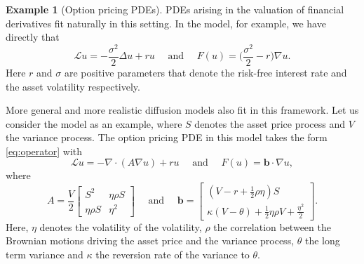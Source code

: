 \documentclass[11pt,a4paper,reqno]{amsart}
\numberwithin{equation}{section}
\theoremstyle{plain}
\theoremstyle{definition}
\newtheorem{example}[theorem]{Example}
\begin{document}
\begin{example}[Option pricing PDEs]
\label{ex:option}
PDEs arising in the valuation of financial derivatives fit naturally in this setting. 
In the \citet{scholes1973pricing} model, for example, we have directly that
\[
    \mathcal{L} u = - \frac{\sigma^2}{2} \Delta u + r u \quad \text{ and } \quad F(u) = \Big( \frac{\sigma^2}{2} - r \Big) \nabla u.
\]
Here $r$ and $\sigma$ are positive parameters that denote the risk-free interest rate and the asset volatility respectively.

More general and more realistic diffusion models also fit in this framework.
Let us consider the \citet{heston1993closed} model as an example, where $S$ denotes the asset price process and $V$ the variance process. 
The option pricing PDE in this model takes the form \eqref{eq:operator} with 
\begin{equation}\label{eq:PR}
\mathcal{L} u = - \nabla \cdot (A \nabla u ) + ru \quad \text{ and } \quad F(u) = \mathbf{b} \cdot \nabla u,
\end{equation}
where
\[
A = \frac{V}{2} \begin{bmatrix} S^2 & \eta \rho S \\ \eta \rho S & \eta^2 \end{bmatrix} 
    \quad \text{ and } \quad
\mathbf{b} = \begin{bmatrix} (V - r + \frac{1}{2} \rho \eta) S \\ \kappa (V - \theta) + \frac{1}{2} \eta \rho V + \frac{\eta^2}{2} \end{bmatrix}.
\]
Here, $\eta$ denotes the volatility of the volatility, $\rho$ the correlation between the Brownian motions driving the asset price and the variance process, $\theta$ the long term variance and $\kappa$ the reversion rate of the variance to $\theta$.

\end{example}
\end{document}
